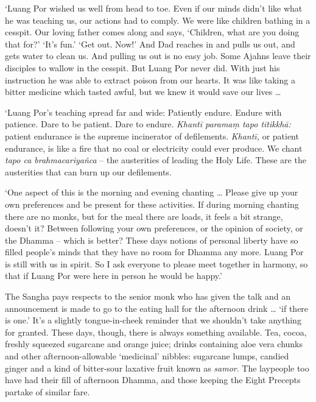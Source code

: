 `Luang Por wished us well from head to toe. Even if our minds didn't
like what he was teaching us, our actions had to comply. We were like
children bathing in a cesspit. Our loving father comes along and says,
`Children, what are you doing that for?' `It's fun.' `Get out. Now!' And
Dad reaches in and pulls us out, and gets water to clean us. And pulling
us out is no easy job. Some Ajahns leave their disciples to wallow in
the cesspit. But Luang Por never did. With just his instruction he was
able to extract poison from our hearts. It was like taking a bitter
medicine which tasted awful, but we knew it would save our lives
\ldots{}

`Luang Por's teaching spread far and wide: Patiently endure. Endure with
patience. Dare to be patient. Dare to endure. \emph{Khantī paramaṃ tapo
tītikkhā:} patient endurance is the supreme incinerator of defilements.
\emph{Khantī,} or patient endurance, is like a fire that no coal or
electricity could ever produce. We chant \emph{tapo ca brahmacariyañca}
-- the austerities of leading the Holy Life. These are the austerities
that can burn up our defilements.

`One aspect of this is the morning and evening chanting \ldots{}
Please give up your own preferences and be present for these activities. 
If during morning chanting there are no monks, but for the meal there
are loads, it feels a bit strange, doesn't it? Between following your
own preferences, or the opinion of society, or the Dhamma -- which is
better? These days notions of personal liberty have so filled people's
minds that they have no room for Dhamma any more. Luang Por is still
with us in spirit. So I ask everyone to please meet together in harmony, 
so that if Luang Por were here in person he would be happy.'

The Sangha pays respects to the senior monk who has given the talk and
an announcement is made to go to the eating hall for the afternoon drink
\ldots{} `if there is one.' It's a slightly tongue-in-cheek reminder
that we shouldn't take anything for granted. These days, though, there
is always something available. Tea, cocoa, freshly squeezed sugarcane
and orange juice; drinks containing aloe vera chunks and other
afternoon-allowable `medicinal' nibbles: sugarcane lumps, candied ginger
and a kind of bitter-sour laxative fruit known as \emph{samor}. The
laypeople too have had their fill of afternoon Dhamma, and those keeping
the Eight Precepts partake of similar fare. 

